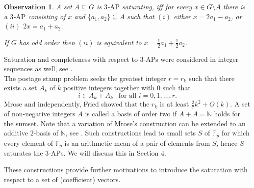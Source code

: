 \documentclass[11pt]{article}
\numberwithin{table}{section}
\newcommand{\F}{{\mathbb F}}
\newtheorem{definition}[theorem]{Definition}
\newtheorem{observ}[theorem]{Observation}
\theoremstyle{definition}
\begin{document}
	\begin{observ}\label{obs1}
		A set $A\subseteq G$ is $3$-$\mathrm{AP}$ saturating, iff  for every $x \in G \setminus A$  there is a $3$-$\mathrm{AP}$  consisting of $x$ and $\{a_1, a_2\}\subseteq A$ such that $(i)$ either  $x=2a_1-a_2$, or $(ii)$ $2x=a_1+a_2$.
		
		If $G$ has odd order then $(ii)$ is equivalent to   %
		$x=\frac12 a_1 + \frac12 a_2$.
	\end{observ}
	\vspace{-0.3cm}
	Saturation and completeness with respect to  $3$-$\mathrm{AP}$s  were considered in integer sequences as well, see \cite{SandorCs, Fang}.\\
	The postage stamp problem seeks the greatest integer  $r=r_k$ such that  there exists a set $A_k$ of $k$ positive integers together with $0$ such that \vspace{-0.3cm} $$i\in A_k+A_k \ \ \mbox{ for all \  } i=0, 1, \ldots, r.$$ 
	Mrose \cite{Mrose} and independently,  Fried \cite{Fried}  showed that the  $r_k$ is at least $\frac{2}{7}k^2+O(k)$. %
	A set of non-negative integers $A$ is called a basis of order two if $A+A=\mathbb{N}$ holds for the sumset. 
	Note that a variation of Mrose's construction can be extended to an additive $2$-basis of $\mathbb{N}$, see \cite{Habsi, Hof}. Such constructions lead to 
	small sets $S$ of $\F_p$ for which every element of $\F_p$ is an arithmetic mean of a pair of elements from $S$, hence $S$ saturates the $3$-$\mathrm{AP}$s. We will discuss this in Section 4.
	
	These constructions provide further motivations to introduce the saturation with respect to a set of (coefficient) vectors. %
	
	
	
\end{document}
